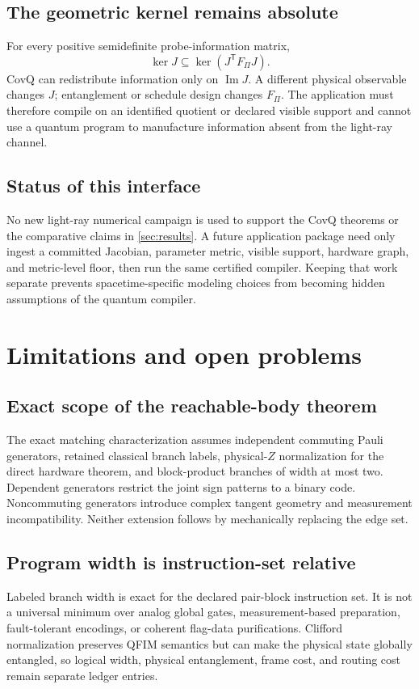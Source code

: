 \documentclass[11pt]{article}
\theoremstyle{definition}
\theoremstyle{remark}
\newcommand{\PiProg}{\mathsf{\Pi}}
\newcommand{\im}{\operatorname{Im}}
\begin{document}
\subsection{The geometric kernel remains absolute}
For every positive semidefinite probe-information matrix,
\begin{equation}
  \ker J\subseteq\ker(J^{\mathsf T}F_{\PiProg}J).
  \label{eq:application-nonlifting}
\end{equation}
CovQ can redistribute information only on $\im J$. A different physical observable changes $J$; entanglement or schedule design changes $F_{\PiProg}$. The application must therefore compile on an identified quotient or declared visible support and cannot use a quantum program to manufacture information absent from the light-ray channel.

\subsection{Status of this interface}
No new light-ray numerical campaign is used to support the CovQ theorems or the comparative claims in \cref{sec:results}. A future application package need only ingest a committed Jacobian, parameter metric, visible support, hardware graph, and metric-level floor, then run the same certified compiler. Keeping that work separate prevents spacetime-specific modeling choices from becoming hidden assumptions of the quantum compiler.


\section{Limitations and open problems}
\label{sec:limitations}

\subsection{Exact scope of the reachable-body theorem}
The exact matching characterization assumes independent commuting Pauli generators, retained classical branch labels, physical-$Z$ normalization for the direct hardware theorem, and block-product branches of width at most two. Dependent generators restrict the joint sign patterns to a binary code. Noncommuting generators introduce complex tangent geometry and measurement incompatibility. Neither extension follows by mechanically replacing the edge set.

\subsection{Program width is instruction-set relative}
Labeled branch width is exact for the declared pair-block instruction set. It is not a universal minimum over analog global gates, measurement-based preparation, fault-tolerant encodings, or coherent flag-data purifications. Clifford normalization preserves QFIM semantics but can make the physical state globally entangled, so logical width, physical entanglement, frame cost, and routing cost remain separate ledger entries.
\end{document}
